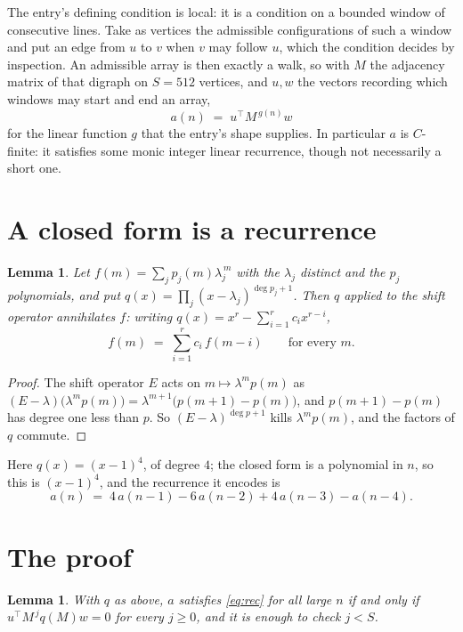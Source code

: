 \documentclass[11pt,a4paper]{article}
\theoremstyle{plain}
\newtheorem{lemma}[theorem]{Lemma}
\theoremstyle{definition}
\begin{document}
The entry's defining condition is local: it is a condition on a bounded window of consecutive lines. Take as vertices the
admissible configurations of such a window and put an edge from $u$ to $v$ when $v$ may
follow $u$, which the condition decides by inspection. An admissible array is then exactly a
walk, so with $M$ the adjacency matrix of that digraph on $S=512$ vertices, and $u,w$ the
vectors recording which windows may start and end an array,
\[
a(n)\;=\;u^{\!\top}M^{\,g(n)}w
\]
for the linear function $g$ that the entry's shape supplies. In particular $a$ is
$C$-finite: it satisfies some monic integer linear recurrence, though not necessarily a short
one.

\section{A closed form is a recurrence}

\begin{lemma}\label{lem:ann}
Let $f(m)=\sum_{j}p_j(m)\lambda_j^{\,m}$ with the $\lambda_j$ distinct and the $p_j$
polynomials, and put $q(x)=\prod_j(x-\lambda_j)^{\deg p_j+1}$. Then $q$ applied to the shift
operator annihilates $f$: writing $q(x)=x^{r}-\sum_{i=1}^{r}c_ix^{r-i}$,
\[
f(m)\;=\;\sum_{i=1}^{r}c_i\,f(m-i)\qquad\text{for every }m.
\]
\end{lemma}

\begin{proof}
The shift operator $E$ acts on $m\mapsto\lambda^{m}p(m)$ as
$(E-\lambda)\bigl(\lambda^{m}p(m)\bigr)=\lambda^{m+1}\bigl(p(m+1)-p(m)\bigr)$, and
$p(m+1)-p(m)$ has degree one less than $p$. So $(E-\lambda)^{\deg p+1}$ kills
$\lambda^{m}p(m)$, and the factors of $q$ commute.
\end{proof}

Here $q(x)=(x-1)^{4}$, of degree $4$; the closed form is a polynomial in $n$, so this is $(x-1)^{4}$, and the recurrence it encodes is
\begin{equation}\label{eq:rec}
a(n)\;=\;4\,a(n-1) - 6\,a(n-2) + 4\,a(n-3) - a(n-4).
\end{equation}

\section{The proof}

\begin{lemma}\label{lem:crit}
With $q$ as above, $a$ satisfies \eqref{eq:rec} for all large $n$ if and only if
$u^{\!\top}M^{\,j}q(M)w=0$ for every $j\ge0$, and it is enough to check $j<S$.
\end{lemma}
\end{document}
